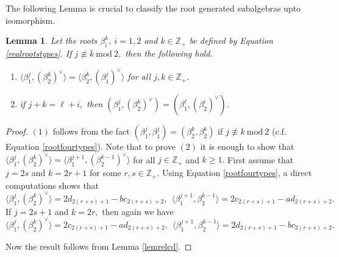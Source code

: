 \documentclass[12pt,reqno]{amsart}
\theoremstyle{plain}
\newtheorem{lem}{Lemma}
\theoremstyle{definition}
\theoremstyle{remark}
\newcommand\bz{\mathbb Z}
\begin{document}
The following Lemma is crucial to classify the root generated subalgebras upto isomorphism.
\begin{lem}\label{lem2noncongruent}
    Let the roots $\beta_{i}^{k},\ i=1,2$ and $k\in \bz_+$ be defined by Equation \ref{realrootstypes}. If $j\not\equiv k\ \mathrm{mod}\ 2,$ then the following hold.
    \begin{enumerate}
        \item $\langle\beta_{1}^{j},(\beta_{2}^{k})^\vee\rangle=\langle\beta_{2}^{k},(\beta_{1}^{j})^\vee\rangle$ for all $j,k\in\bz_+.$
        \item if $j+k=\ell+i,$ then $(\beta_{1}^{j},(\beta_{2}^{k})^\vee)=(\beta_{1}^{\ell},(\beta_{2}^{i})^\vee)$.
    \end{enumerate}
\end{lem}
\begin{proof}
$(1)$ follows from the fact $(\beta_1^j,\beta_1^j)=(\beta_2^k,\beta_2^k)$ if $j\not\equiv k\ \mathrm{mod}\ 2$ (c.f. Equation \ref{rootfourtypes}). Note that to prove $(2)$ it is enough to show that $\langle\beta_{1}^{j},(\beta_{2}^{k})^\vee\rangle=\langle\beta_{1}^{j+1},(\beta_{2}^{k-1})^\vee\rangle$ for all $j\in\bz_+$ and $k\geq 1.$ First assume that $j=2s$ and $k=2r+1$ for some $r,s\in\bz_+.$ Using Equation \ref{rootfourtypes}, a direct computations shows that 
$$\langle \beta_{1}^{j},(\beta_{2}^{k})^\vee\rangle=2d_{2(r+s)+1}-bc_{2(r+s)+2},\ \ \langle \beta_{1}^{j+1},\beta_{2}^{k-1}\rangle=2c_{2(r+s)+1}-ad_{2(r+s)+2}.$$
If $j=2s+1$ and $k=2r,$ then again we have 
$$\langle \beta_{1}^{j},(\beta_{2}^{k})^\vee\rangle=2c_{2(r+s)+1}-ad_{2(r+s)+2},\ \ \langle \beta_{1}^{j+1},\beta_{2}^{k-1}\rangle=2d_{2(r+s)+1}-bc_{2(r+s)+2}.$$

Now the result follows from Lemma \ref{lemrelcd}.
\end{proof}
\end{document}
